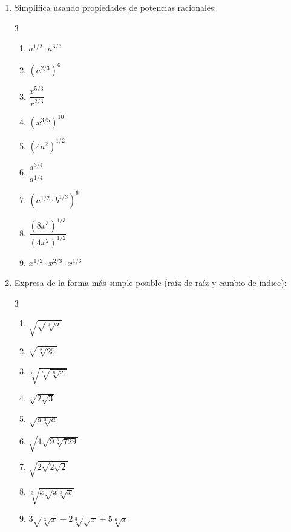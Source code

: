 \documentclass[11pt, letterpaper]{article}
\begin{document}
\begin{enumerate}[label=\textbf{\arabic*.}, leftmargin=*, resume]
  \item Simplifica usando propiedades de potencias racionales:
  \begin{multicols}{3}
  \begin{enumerate}[label=\alph*)]
    \item $a^{1/2}\cdot a^{3/2}$
    \item $(a^{2/3})^6$
    \item $\dfrac{x^{5/3}}{x^{2/3}}$
    \item $(x^{3/5})^{10}$
    \item $(4a^2)^{1/2}$
    \item $\dfrac{a^{3/4}}{a^{1/4}}$
    \item $(a^{1/2}\cdot b^{1/3})^6$
    \item $\dfrac{(8x^3)^{1/3}}{(4x^2)^{1/2}}$
    \item $x^{1/2}\cdot x^{2/3}\cdot x^{1/6}$
  \end{enumerate}
  \end{multicols}

  \item Expresa de la forma más simple posible (raíz de raíz y cambio de índice):
  \begin{multicols}{3}
  \begin{enumerate}[label=\alph*)]
    \item $\sqrt{\sqrt{\sqrt[3]{a}}}$
    \item $\sqrt{\sqrt[3]{25}}$
    \item $\sqrt[n]{\sqrt[n]{\sqrt[n]{x}}}$
    \item $\sqrt{2\sqrt{3}}$
    \item $\sqrt{a\sqrt[3]{a}}$
    \item $\sqrt{4\sqrt{9\sqrt[3]{729}}}$
    \item $\sqrt{2\sqrt{2\sqrt{2}}}$
    \item $\sqrt[3]{x\sqrt{x\sqrt[3]{x}}}$
    \item $3\sqrt{\sqrt[3]{x}}-2\sqrt[3]{\sqrt{x}}+5\sqrt[6]{x}$
  \end{enumerate}
  \end{multicols}


\end{enumerate}
\end{document}
